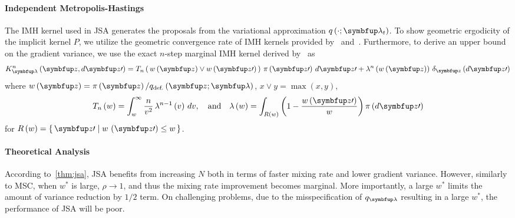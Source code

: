 \paragraph{Independent Metropolis-Hastings}
The IMH kernel used in JSA generates the proposals from the variational approximation \(q\left(\cdot; \vlambda_t\right)\).
To show geometric ergodicity of the implicit kernel \(P\), we utilize the geometric convergence rate of IMH kernels provided by~\citet[Theorem 2.1]{10.2307/2242610} and~\citet{wang_exact_2020}.
Furthermore, to derive an upper bound on the gradient variance, we use the exact \(n\)-step marginal IMH kernel derived by~\citet{Smith96exacttransition} as
{%
  \begin{align}
  K^n_{\vlambda}\left(\vz, d\vz\prime\right) 
  = T_n\left(\, w\left(\vz\right) \vee w\left(\vz\prime\right)\,\right) \, \pi\left(\vz\prime\right) \, d\vz\prime
  + \lambda^n\left(w\left(\vz\right)\right) \, \delta_{\vz}\left(d\vz\prime\right)
  \label{eq:imh_exact_kernel}
  \end{align}
}%
where {\(w\left(\vz\right) = \pi\left(\vz\right)/q_{\text{def.}}\left(\vz; \vlambda\right)\), \(x \vee y = \max\left(x, y\right)\)},
{\small
  \begin{align}
    T_n\left(w\right)      = \int_w^{\infty}
    \frac{n}{v^2}
    \, \lambda^{n-1}\left(v\right)\,dv,
    \quad\text{and}\quad
    \lambda\left(w\right) =
    \int_{R\left(w\right)}
    \left( 1 - \frac{w\left(\vz\prime\right)}{w}  \right)
    \pi\left(d\vz\prime\right)\label{eq:T_lambda}
  \end{align}
}
for {\(R\left(w\right) = \{\, \vz\prime \mid w\,\left(\vz\prime\right) \leq w \,\}\)}.
%


%
\paragraph{Theoretical Analysis}
According to~\cref{thm:jsa}, JSA benefits from increasing \(N\) both in terms of faster mixing rate and lower gradient variance.
However, similarly to MSC, when \(w^*\) is large, \(\rho \rightarrow 1\), and thus the mixing rate improvement becomes marginal.
More importantly, a large \(w^*\) limits the amount of variance reduction by \(1/2\) term.
On challenging problems, due to the misspecification of \(q_{\vlambda}\) resulting in a large \(w^*\), the performance of JSA will be poor.


